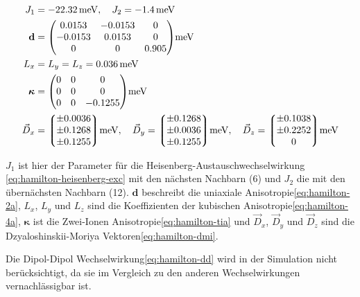 \documentclass[main.tex]{subfiles}
\begin{document}
\begin{align}
	J_1           & = \SI{-22,32}{\milli\electronvolt}, \quad J_2 =
	\SI{-1,4}{\milli\electronvolt}\label{eq:params-exc}
	\\
	\mat{d}       & = \mqty(
	\num{0.0153}  & \num{-0.0153}                                   & 0
	\\
	\num{-0.0153} & \num{0.0153}                                    & 0
	\\
	0             & 0                                               &
	\num{0.905})\si{\milli\electronvolt} \label{eq:params-2a}
	\\
	L_x           & = L_y = L_z =
	\SI{0.036}{\milli\electronvolt}\label{eq:params-4a}
	\\
	\mat{\kappa}  & = \mqty(
	0             & 0                                               & 0
	\\
	0             & 0                                               & 0
	\\
	0             & 0                                               &
	\num{-0.1255})\si{\milli\electronvolt} \label{eq:params-tia}
	\\
	\vec{D}_x     & = \mqty*(\num{\pm 0.0036}
	\\ \num{\pm 0.1268} \\ \num{\pm
		0.1255})\si{\milli\electronvolt} , \quad
	\vec{D}_y = \mqty*(\num{\pm 0.1268}
	\\ \num{\pm 0.0036} \\ \num{\pm
		0.1255})\si{\milli\electronvolt} , \quad
	\vec{D}_z = \mqty*(\num{\pm 0.1038}
	\\ \num{\pm 0.2252} \\ 0)\si{\milli\electronvolt} \label{eq:params-dmi}
\end{align}

\(J_1\) ist hier der Parameter für die Heisenberg-Austauschwechselwirkung
\eqref{eq:hamilton-heisenberg-exc} mit den nächsten Nachbarn (6) und \(J_2\)
die mit den übernächsten Nachbarn (12). \(\bm{d}\)
beschreibt die uniaxiale Anisotropie\eqref{eq:hamilton-2a}, \(L_x\), \(L_y\)
und \(L_z\) sind die Koeffizienten der kubischen
Anisotropie\eqref{eq:hamilton-4a}, \(\bm{\kappa}\) ist die Zwei-Ionen
Anisotropie\eqref{eq:hamilton-tia} und \(\vec{D}_x\), \(\vec{D}_y\) und
\(\vec{D}_z\) sind die Dzyaloshinskii-Moriya Vektoren\eqref{eq:hamilton-dmi}.

Die Dipol-Dipol Wechselwirkung\eqref{eq:hamilton-dd} wird in der Simulation
nicht berücksichtigt, da sie im Vergleich zu den anderen Wechselwirkungen
vernachlässigbar ist.
\end{document}
